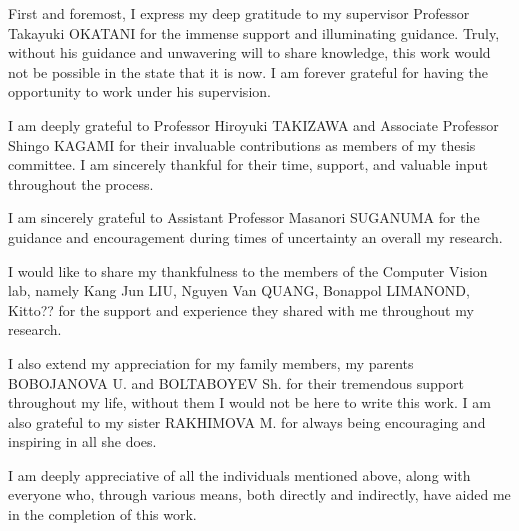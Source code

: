 
\begin{acknowledgments}

First and foremost, I express my deep gratitude to my supervisor Professor Takayuki OKATANI for the immense support and illuminating guidance. Truly, without his guidance and unwavering will to share knowledge, this work would not be possible in the state that it is now. I am forever grateful for having the opportunity to work under his supervision.

I am deeply grateful to Professor Hiroyuki TAKIZAWA and Associate Professor Shingo KAGAMI for their invaluable contributions as members of my thesis committee. I am sincerely thankful for their time, support, and valuable input throughout the process.

I am sincerely grateful to Assistant Professor Masanori SUGANUMA for the guidance and encouragement during times of uncertainty an overall my research.

I would like to share my thankfulness to the members of the Computer Vision lab, namely Kang Jun LIU, Nguyen Van QUANG, Bonappol LIMANOND, Kitto?? for the support and experience they shared with me throughout my research. 

I also extend my appreciation for my family members, my parents BOBOJANOVA U. and BOLTABOYEV Sh. for their tremendous support throughout my life, without them I would not be here to write this work. I am also grateful to my sister RAKHIMOVA M. for always being encouraging and inspiring in all she does.

I am deeply appreciative of all the individuals mentioned above, along with everyone who, through various means, both directly and indirectly, have aided me in the completion of this work.

\end{acknowledgments}